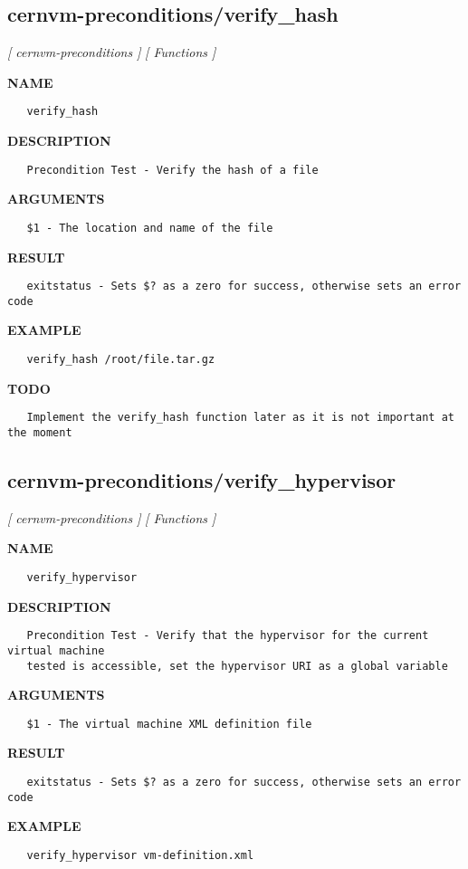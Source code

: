 \subsection{cernvm-preconditions/verify\_hash}
\textsl{[ cernvm-preconditions ]}
\textsl{[ Functions ]}

\label{ch:robo11}
\label{ch:cernvm_preconditions_verify_hash}
\textbf{NAME}
\begin{verbatim}
   verify_hash
\end{verbatim}
\textbf{DESCRIPTION}
\begin{verbatim}
   Precondition Test - Verify the hash of a file
\end{verbatim}
\textbf{ARGUMENTS}
\begin{verbatim}
   $1 - The location and name of the file
\end{verbatim}
\textbf{RESULT}
\begin{verbatim}
   exitstatus - Sets $? as a zero for success, otherwise sets an error code
\end{verbatim}
\textbf{EXAMPLE}
\begin{verbatim}
   verify_hash /root/file.tar.gz
\end{verbatim}
\textbf{TODO}
\begin{verbatim}
   Implement the verify_hash function later as it is not important at the moment
\end{verbatim}
\newpage
\subsection{cernvm-preconditions/verify\_hypervisor}
\textsl{[ cernvm-preconditions ]}
\textsl{[ Functions ]}

\label{ch:robo12}
\label{ch:cernvm_preconditions_verify_hypervisor}
\textbf{NAME}
\begin{verbatim}
   verify_hypervisor
\end{verbatim}
\textbf{DESCRIPTION}
\begin{verbatim}
   Precondition Test - Verify that the hypervisor for the current virtual machine
   tested is accessible, set the hypervisor URI as a global variable
\end{verbatim}
\textbf{ARGUMENTS}
\begin{verbatim}
   $1 - The virtual machine XML definition file
\end{verbatim}
\textbf{RESULT}
\begin{verbatim}
   exitstatus - Sets $? as a zero for success, otherwise sets an error code
\end{verbatim}
\textbf{EXAMPLE}
\begin{verbatim}
   verify_hypervisor vm-definition.xml
\end{verbatim}
\newpage
